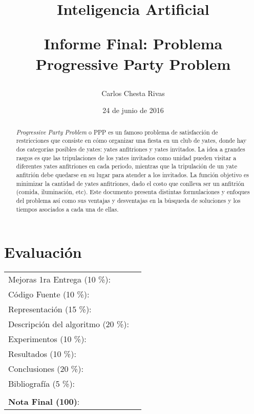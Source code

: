 \documentclass[letter, 10pt]{article}
\begin{document}
\title{Inteligencia Artificial \\ \begin{Large}Informe Final: Problema Progressive Party Problem\end{Large}}
\author{Carlos Chesta Rivas}
\date{24 de junio de 2016}
\maketitle


\section*{Evaluaci\'on}

\begin{tabular}{ll}
Mejoras 1ra Entrega (10 \%): &  \underline{\hspace{2cm}}\\
C\'odigo Fuente (10 \%): &  \underline{\hspace{2cm}}\\
Representaci\'on (15 \%):  & \underline{\hspace{2cm}} \\
Descripci\'on del algoritmo (20 \%):  & \underline{\hspace{2cm}} \\
Experimentos (10 \%):  & \underline{\hspace{2cm}} \\
Resultados (10 \%):  & \underline{\hspace{2cm}} \\
Conclusiones (20 \%): &  \underline{\hspace{2cm}}\\
Bibliograf\'ia (5 \%): & \underline{\hspace{2cm}}\\
 &  \\
\textbf{Nota Final (100)}:   & \underline{\hspace{2cm}}
\end{tabular}
\vspace{2cm}


\begin{abstract}

\textit{Progressive Party Problem} o PPP es un famoso problema de satisfacción de restricciones que consiste en cómo organizar una fiesta en un club de yates, donde hay dos categorías posibles de yates: yates anfitriones y yates invitados. La idea a grandes rasgos es que las tripulaciones de los yates invitados como unidad pueden visitar a diferentes yates anfitriones en cada periodo, mientras que la tripulación de un yate anfitrión debe quedarse en su lugar para atender a los invitados. La función objetivo es minimizar la cantidad de yates anfitriones, dado el costo que conlleva ser un anfitrión (comida, iluminación, etc). Este documento presenta distintas formulaciones y enfoques del problema así como sus ventajas y desventajas en la búsqueda de soluciones y los tiempos asociados a cada una de ellas.
\end{abstract}
\end{document}
